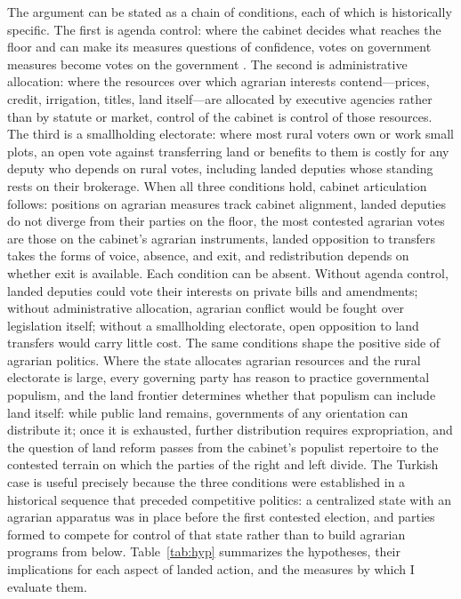 \documentclass[12pt]{article}
\begin{document}
The argument can be stated as a chain of conditions, each of which is historically specific. The first is agenda control: where the cabinet decides what reaches the floor and can make its measures questions of confidence, votes on government measures become votes on the government \citep{cox1987,huber1996}. The second is administrative allocation: where the resources over which agrarian interests contend---prices, credit, irrigation, titles, land itself---are allocated by executive agencies rather than by statute or market, control of the cabinet is control of those resources. The third is a smallholding electorate: where most rural voters own or work small plots, an open vote against transferring land or benefits to them is costly for any deputy who depends on rural votes, including landed deputies whose standing rests on their brokerage. When all three conditions hold, cabinet articulation follows: positions on agrarian measures track cabinet alignment, landed deputies do not diverge from their parties on the floor, the most contested agrarian votes are those on the cabinet's agrarian instruments, landed opposition to transfers takes the forms of voice, absence, and exit, and redistribution depends on whether exit is available. Each condition can be absent. Without agenda control, landed deputies could vote their interests on private bills and amendments; without administrative allocation, agrarian conflict would be fought over legislation itself; without a smallholding electorate, open opposition to land transfers would carry little cost. The same conditions shape the positive side of agrarian politics. Where the state allocates agrarian resources and the rural electorate is large, every governing party has reason to practice governmental populism, and the land frontier determines whether that populism can include land itself: while public land remains, governments of any orientation can distribute it; once it is exhausted, further distribution requires expropriation, and the question of land reform passes from the cabinet's populist repertoire to the contested terrain on which the parties of the right and left divide. The Turkish case is useful precisely because the three conditions were established in a historical sequence that preceded competitive politics: a centralized state with an agrarian apparatus was in place before the first contested election, and parties formed to compete for control of that state rather than to build agrarian programs from below. Table~\ref{tab:hyp} summarizes the hypotheses, their implications for each aspect of landed action, and the measures by which I evaluate them.
\end{document}
